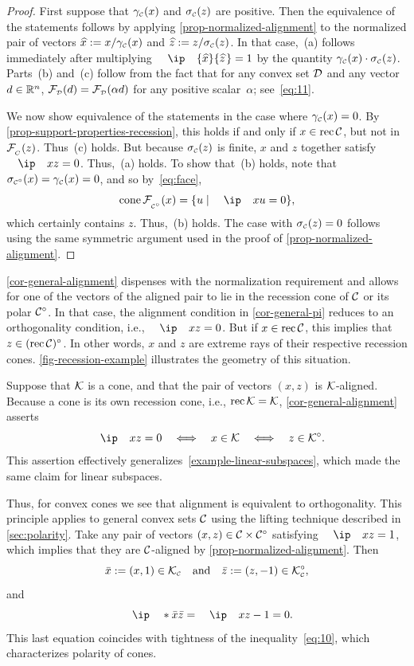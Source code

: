 \begin{proof}
  First suppose that $\gamma_{\scriptscriptstyle\mathcal{C}}(x)$ and $\sigma_{\scriptscriptstyle\mathcal{C}}(z)$ are positive. Then the
  equivalence of the statements follows by applying
  \autoref{prop-normalized-alignment} to the normalized pair of vectors
  $\xhat:=x/\gamma\Cs(x)$ and $\zhat:=z/\sigma\Cs(z)$. In that case,~(a) follows
  immediately after multiplying $\ip{\xhat}{\zhat\pthinsp}=1$ by the quantity
  $\gamma_{\scriptscriptstyle\mathcal{C}}(x)\cdot\sigma_{\scriptscriptstyle\mathcal{C}}(z)$. Parts~(b) and~(c) follow from the fact that
  for any convex set $\mathcal{D}$ and any vector $d\in\mathbb{R}^n$,
  $\mathcal{F}_{\scriptscriptstyle \mathcal{D}}(d)=\mathcal{F}_{\scriptscriptstyle \mathcal{D}}(\alpha d)$ for any positive scalar~$\alpha$;
  see~\eqref{eq:11}.

  We now show equivalence of the statements in the case where $\gamma_{\scriptscriptstyle\mathcal{C}}(x)=0$.
  By \autoref{prop-support-properties-recession}, this holds if and only if
  $x\in\operatorname{rec}\mathcal{C}$, but not in $\mathcal{F}_{\scriptscriptstyle _{\scriptscriptstyle C}}(z)$. Thus~(c) holds. But because
  $\sigma_{\scriptscriptstyle\mathcal{C}}(z)$ is finite, $x$ and $z$ together satisfy $\ip x z =0$. Thus,~(a)
  holds. To show that~(b) holds, note that $\sigma_{\scriptscriptstyle\mathcal{C}^\circ}(x)=\gamma_{\scriptscriptstyle\mathcal{C}}(x)=0$, and
  so by~\eqref{eq:face},
  \[
    \cone\Face\Csp(x) = \{ u \mid \ip x u = 0\},
  \]
  which certainly contains $z$. Thus,~(b) holds.  The case with
  $\sigma_{\scriptscriptstyle\mathcal{C}}(z)=0$ follows using the same symmetric argument used in
  the proof of \autoref{prop-normalized-alignment}.
\end{proof}

\autoref{cor-general-alignment} dispenses with the normalization requirement and
allows for one of the vectors of the aligned pair to lie in the recession cone
of $\mathcal{C}$ or its polar $\mathcal{C}^\circ$. In that case, the alignment condition in
\autoref{cor-general-pi} reduces to an orthogonality condition, i.e., $\ip x z=0$.
But if $x\in\operatorname{rec}\mathcal{C}$, this implies that $z\in(\operatorname{rec}\mathcal{C})^\circ$. In other
words, $x$ and $z$ are extreme rays of their respective recession cones.
\autoref{fig-recession-example} illustrates the geometry of this situation.

\begin{example}
  \label{ex:convex-cones}
  Suppose that $\mathcal{K}$ is a cone, and that the pair of vectors $(x,z)$ is
  $\mathcal{K}$-aligned. Because a cone is its own recession cone, i.e.,
  $\operatorname{rec}\mathcal{K}=\mathcal{K}$, \autoref{cor-general-alignment} asserts
  \[
  \ip x z = 0      \quad\Longleftrightarrow\quad
  x\in\Kscr        \quad\Longleftrightarrow\quad
  z\in\Kscr\polar.
\]
This assertion effectively generalizes~\autoref{example-linear-subspaces}, which
made the same claim for linear subspaces.

Thus, for convex cones we see that alignment is equivalent to
orthogonality. This principle applies to general convex sets $\mathcal{C}$
using the lifting technique described in \autoref{sec:polarity}. Take any
pair of vectors $(x,z)\in\mathcal{C}\times\mathcal{C}^\circ$ satisfying $\ip x z=1$, which
implies that they are $\mathcal{C}$-aligned by \autoref{prop-normalized-alignment}. Then
\[
  \xbar:=(x,1)\in\Kscr\Cs \text{and} \zbar:=(z,-1)\in\Kscr\Cs\polar,
\]
and
\[
  \ip*{\xbar}{\zbar} = \ip x z -1 = 0.
\]
This last equation coincides with tightness of the inequality~\eqref{eq:10}, which
characterizes polarity of cones.
\end{example}

